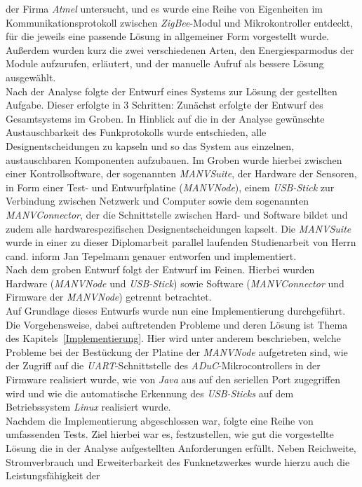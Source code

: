 der Firma \emph{Atmel} untersucht, und es wurde eine Reihe von Eigenheiten im Kommunikationsprotokoll 
zwischen \emph{ZigBee}-Modul und Mikrokontroller entdeckt, für die jeweils eine passende Lösung in 
allgemeiner Form vorgestellt wurde.  Außerdem wurden kurz die zwei verschiedenen Arten, 
den Energiesparmodus der Module aufzurufen, erläutert, und der manuelle Aufruf als bessere Lösung ausgewählt.\\
Nach der Analyse folgte der Entwurf eines Systems zur Lösung der gestellten Aufgabe. Dieser erfolgte in 3 
Schritten: Zunächst erfolgte der Entwurf des Gesamtsystems im Groben. In Hinblick auf die in der Analyse
gewünschte Austauschbarkeit des Funkprotokolls wurde entschieden, alle Designentscheidungen zu kapseln und
so das System aus einzelnen, austauschbaren Komponenten aufzubauen. Im Groben wurde hierbei zwischen
einer Kontrollsoftware, der sogenannten \emph{MANVSuite}, der Hardware der Sensoren, in Form einer 
Test- und Entwurfplatine (\emph{MANVNode}), einem \emph{USB-Stick} zur Verbindung zwischen Netzwerk und Computer
sowie dem sogenannten \emph{MANVConnector}, der die Schnittstelle zwischen Hard- und Software bildet und zudem
alle hardwarespezifischen Designentscheidungen kapselt. Die \emph{MANVSuite} wurde in einer
zu dieser Diplomarbeit parallel laufenden Studienarbeit von Herrn cand. inform Jan Tepelmann genauer entworfen
und implementiert.\cite{Jan}\\
Nach dem groben Entwurf folgt der Entwurf im Feinen. Hierbei wurden Hardware (\emph{MANVNode} und \emph{USB-Stick})
sowie Software (\emph{MANVConnector} und Firmware der \emph{MANVNode}) getrennt betrachtet.\\
Auf Grundlage dieses Entwurfs wurde nun eine Implementierung durchgeführt. Die Vorgehensweise, 
dabei auftretenden Probleme und deren Lösung ist Thema des Kapitels~\ref{Implementierung}.
Hier wird unter anderem beschrieben, welche Probleme bei der Bestückung der Platine der \emph{MANVNode} aufgetreten
sind, wie der Zugriff auf die \emph{UART}-Schnittstelle des \emph{ADuC}-Mikrocontrollers in der Firmware
realisiert wurde, wie von \emph{Java} aus auf den seriellen Port zugegriffen wird und wie die automatische
Erkennung des \emph{USB-Sticks} auf dem Betriebssystem \emph{Linux} realisiert wurde.\\
Nachdem die Implementierung abgeschlossen war, folgte eine Reihe von umfassenden Tests. Ziel hierbei war es,
festzustellen, wie gut die vorgestellte Lösung die in der Analyse aufgestellten Anforderungen erfüllt. Neben
Reichweite, Stromverbrauch und Erweiterbarkeit des Funknetzwerkes wurde hierzu auch die Leistungsfähigkeit der 
